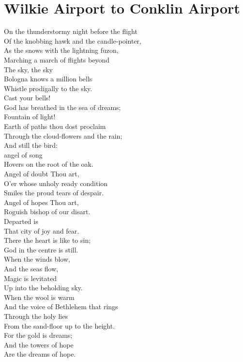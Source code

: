 \documentclass[smalldemyvopaper,11pt,twoside,onecolumn,openright,extrafontsizes]{memoir}
\begin{document}
\chapter{Wilkie Airport to Conklin Airport}
On the thunderstormy night before the flight
\\Of the knobbing hawk and the candle-pointer,
\\As the snows with the lightning fuzon,
\\Marching a march of flights beyond
\\The sky, the sky
\\Bologna knows a million bells
\\Whistle prodigally to the sky.
\\Cast your bells!
\\God has breathed in the sea of dreams;
\\Fountain of light!
\\Earth of paths thou dost proclaim
\\Through the cloud-flowers and the rain;
\\And still the bird:
\\angel of song
\\Hovers on the root of the oak.
\\Angel of doubt Thou art,
\\O'er whose unholy ready condition
\\Smiles the proud tears of despair.
\\Angel of hopes Thou art,
\\Roguish bishop of our disart.
\\Departed is
\\That city of joy and fear.
\\There the heart is like to sin;
\\God in the centre is still.
\\When the winds blow,
\\And the seas flow,
\\Magic is levitated
\\Up into the beholding sky.
\\When the wool is warm
\\And the voice of Bethlehem that rings
\\Through the holy lies
\\From the sand-floor up to the height.
\\For the gold is dreams;
\\And the towers of hope
\\Are the dreams of hope.
\end{document}
